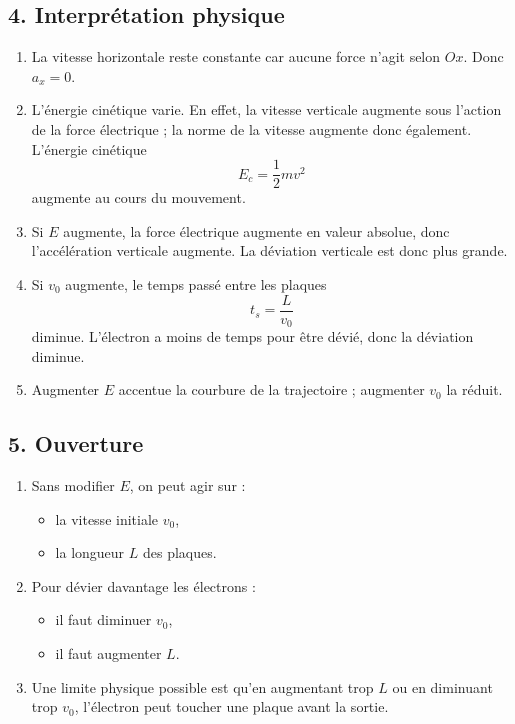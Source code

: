 \documentclass[11pt,a4paper]{article}
\begin{document}
\subsection*{4. Interprétation physique}

\begin{enumerate}
    \item La vitesse horizontale reste constante car aucune force n'agit selon \(Ox\). Donc \(a_x=0\).

    \item L'énergie cinétique varie. En effet, la vitesse verticale augmente sous l'action de la force électrique ; la norme de la vitesse augmente donc également. L'énergie cinétique
    \[
    E_c=\frac12 mv^2
    \]
    augmente au cours du mouvement.

    \item Si \(E\) augmente, la force électrique augmente en valeur absolue, donc l'accélération verticale augmente. La déviation verticale est donc plus grande.

    \item Si \(v_0\) augmente, le temps passé entre les plaques
    \[
    t_s=\frac{L}{v_0}
    \]
    diminue. L'électron a moins de temps pour être dévié, donc la déviation diminue.

    \item Augmenter \(E\) accentue la courbure de la trajectoire ; augmenter \(v_0\) la réduit.
\end{enumerate}

\subsection*{5. Ouverture}

\begin{enumerate}
    \item Sans modifier \(E\), on peut agir sur :
    \begin{itemize}
        \item la vitesse initiale \(v_0\),
        \item la longueur \(L\) des plaques.
    \end{itemize}

    \item Pour dévier davantage les électrons :
    \begin{itemize}
        \item il faut diminuer \(v_0\),
        \item il faut augmenter \(L\).
    \end{itemize}

    \item Une limite physique possible est qu'en augmentant trop \(L\) ou en diminuant trop \(v_0\), l'électron peut toucher une plaque avant la sortie.
\end{enumerate}
\end{document}
